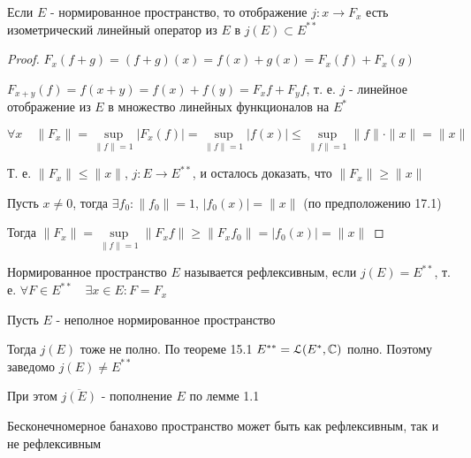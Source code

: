 \documentclass[a4paper,12pt]{report}
\begin{document}
\begin{thm}
Если $E$ - нормированное пространство, то отображение $j\colon x\to F_x$ есть изометрический линейный оператор из $E$ в $j(E)\subset E^{**}$
\end{thm}
\begin{proof}
$F_x(f+g)=(f+g)(x)=f(x)+g(x)=F_x(f)+F_x(g)$

$F_{x+y}(f)=f(x+y)=f(x)+f(y)=F_xf+F_yf$, т. е. $j$ - линейное отображение из $E$ в множество линейных функционалов на $E^*$

$\forall x\quad\|F_x\|=\sup\limits_{\|f\|=1}|F_x(f)|=\sup\limits_{\|f\|=1}|f(x)|\le\sup\limits_{\|f\|=1}\|f\|\cdot\|x\|=\|x\|$

Т. е. $\|F_x\|\le\|x\|$, $j\colon E\to E^{**}$, и осталось доказать, что $\|F_x\|\ge\|x\|$

Пусть $x\ne0$, тогда $\exists f_0\colon\|f_0\|=1$, $|f_0(x)|=\|x\|$ (по предположению 17.1)

Тогда $\|F_x\|=\sup\limits_{\|f\|=1}\|F_x f\|\ge\|F_x f_0\|=|f_0(x)|=\|x\|$
\end{proof}
 


\begin{df}
Нормированное пространство $E$ называется рефлексивным, если $j(E)=E^{**}$, т. е. $\forall F\in E^{**}\quad\exists x\in E\colon F=F_x$
\end{df}
 


\begin{ex}
Пусть $E$ - неполное нормированное пространство

Тогда $j(E)$ тоже не полно. По теореме 15.1 $E^{**}=\EuScript L(E^*,\mathbb C)$ полно. Поэтому заведомо $j(E)\ne E^{**}$

При этом $\overline{j(E)}$ - пополнение $E$ по лемме 1.1
\end{ex}
 


\begin{rem}
Бесконечномерное банахово пространство может быть как рефлексивным, так и не рефлексивным
\end{rem}
 
\end{document}
